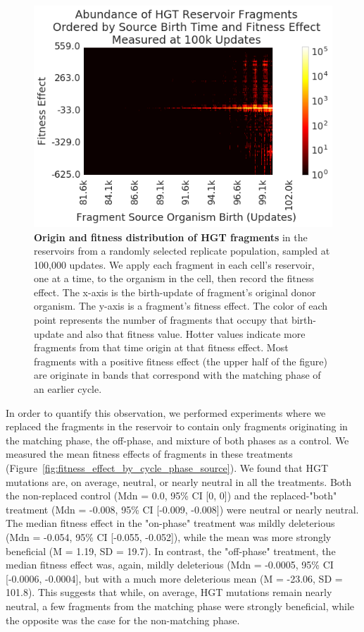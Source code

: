 \documentclass[PhD]{msu-thesis}
\begin{document}
\begin{figure}[h!]
\begin{center}
\includegraphics[width=0.7\columnwidth]{figures/HGT/fitness_effect_heatmap.png}
\caption{\textbf{Origin and fitness distribution of HGT fragments} in the reservoirs from a randomly selected replicate population, sampled at 100,000 updates. We apply each fragment in each cell's reservoir, one at a time, to the organism in the cell, then record the fitness effect. The x-axis is the birth-update of fragment's original donor organism. The y-axis is a fragment's fitness effect. The color of each point represents the number of fragments that occupy that birth-update and also that fitness value. Hotter values indicate more fragments from that time origin at that fitness effect. Most fragments with a positive fitness effect (the upper half of the figure) are originate in bands that correspond with the matching phase of an earlier cycle. 
}\label{fig:fitness_effect_heatmap}
\end{center}
\end{figure}


In order to quantify this observation, we performed experiments where we replaced the fragments in the reservoir to contain only fragments originating in the matching phase, the off-phase, and mixture of both phases as a control. We measured the mean fitness 
effects of fragments in these treatments (Figure~\ref{fig:fitness_effect_by_cycle_phase_source}). We found that HGT mutations are, on average, neutral, or nearly neutral in all the treatments. Both the non-replaced control (Mdn = 0.0, 95\% CI [0, 0]) and the replaced-"both" treatment (Mdn = -0.008, 95\% CI [-0.009, -0.008]) were neutral or nearly neutral. The median fitness effect in the "on-phase" treatment was mildly deleterious (Mdn = -0.054, 95\% CI [-0.055, -0.052]), while the mean was more strongly beneficial (M = 1.19, SD = 19.7). In contrast, the "off-phase" treatment, the median fitness effect was, again, mildly deleterious (Mdn = -0.0005, 95\% CI [-0.0006, -0.0004], but with a much more deleterious mean (M = -23.06, SD = 101.8). This suggests that while, on average, HGT mutations remain nearly neutral, a few fragments from the matching phase were strongly beneficial, while the opposite was the case for the non-matching phase.
\end{document}
